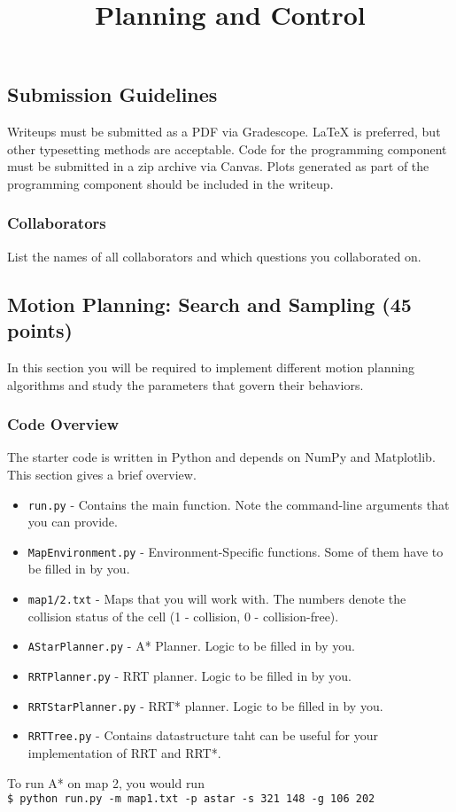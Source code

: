 \documentclass{article}
\title{Planning and Control}
\author{}
\date{}
\newcommand{\?}{\stackrel{?}{=}}
\begin{document}
\maketitle

\subsection*{Submission Guidelines}

Writeups must be submitted as a PDF via Gradescope.
\LaTeX{} is preferred, but other typesetting methods are acceptable.
Code for the programming component must be submitted in a zip archive via Canvas.
Plots generated as part of the programming component should be included in the writeup.


\subsubsection*{Collaborators}

List the names of all collaborators and which questions you collaborated on.

\subsection{Motion Planning: Search and Sampling (45 points)}
In this section you will be required to implement different motion planning algorithms and study the parameters that govern their behaviors. 

\subsubsection{Code Overview}
The starter code is written in Python and depends on NumPy and Matplotlib. This section gives a brief overview.

\begin{itemize}
	\item \texttt{run.py} - Contains the main function. Note the command-line arguments that you can provide.
	\item \texttt{MapEnvironment.py} - Environment-Specific functions. Some of them have to be filled in by you.
	\item \texttt{map1/2.txt} - Maps that you will work with. The numbers denote the collision status of the cell (1 - collision, 0 - collision-free).
	\item \texttt{AStarPlanner.py} - A* Planner. Logic to be filled in by you.
	\item \texttt{RRTPlanner.py} - RRT planner. Logic to be filled in by you.
	\item \texttt{RRTStarPlanner.py} - RRT* planner. Logic to be filled in by you.
	\item \texttt{RRTTree.py} - Contains datastructure taht can be useful for your implementation of RRT and RRT*.
\end{itemize}
To run A* on map 2, you would run \\
\texttt{\$ python run.py -m map1.txt -p astar -s 321 148 -g 106 202}
\end{document}
